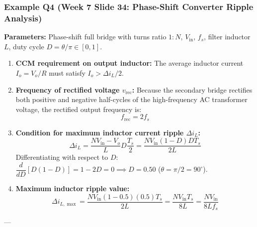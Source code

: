 \subsubsection{Example Q4 (Week 7 Slide 34: Phase-Shift Converter Ripple Analysis)}
\textbf{Parameters:} Phase-shift full bridge with turns ratio $1:N$, $V_{\mathrm{in}}$, $f_s$, filter inductor $L$, duty cycle $D = \theta / \pi \in [0, 1]$.
\begin{enumerate}
  \item \textbf{CCM requirement on output inductor:}
  The average inductor current $I_o = V_o / R$ must satisfy $I_o > \Delta i_L / 2$.
  \item \textbf{Frequency of rectified voltage $v_{\mathrm{rec}}$:}
  Because the secondary bridge rectifies both positive and negative half-cycles of the high-frequency AC transformer voltage, the rectified output frequency is:
  \[
  f_{\mathrm{rec}} = 2 f_s
  \]
  \item \textbf{Condition for maximum inductor current ripple $\Delta i_L$:}
  \[
  \Delta i_L = \frac{N V_{\mathrm{in}} - V_o}{L} D \frac{T_s}{2} = \frac{N V_{\mathrm{in}}(1-D) D T_s}{2 L}
  \]
  Differentiating with respect to $D$: $\dfrac{d}{dD}[D(1-D)] = 1 - 2D = 0 \implies D = 0.50$ ($\theta = \pi/2 = 90^\circ$).
  \item \textbf{Maximum inductor ripple value:}
  \[
  \Delta i_{L,\max} = \frac{N V_{\mathrm{in}} (1 - 0.5)(0.5) T_s}{2 L} = \frac{N V_{\mathrm{in}} T_s}{8 L} = \frac{N V_{\mathrm{in}}}{8 L f_s}
  \]
\end{enumerate}

---

